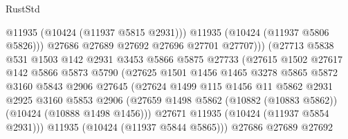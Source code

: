 \begin{lexlean}{RustStd}
\begin{coremodule}
                                      @11935
                                      (@10424 (@11937 @5815 @2931)))
                                    @11935
                                    (@10424 (@11937 @5806 @5826)))
                                  @27686
                                  @27689
                                  @27692
                                  @27696
                                  @27701
                                  @27707)))
                            (@27713
                              @5838
                              @531
                              @1503
                              @142
                              @2931
                              @3453
                              @5866
                              @5875
                              @27733
                              (@27615
                                @1502
                                @27617
                                @142
                                @5866
                                @5873
                                @5790
                                (@27625
                                  @1501
                                  @1456
                                  @1465
                                  @3278
                                  @5865
                                  @5872
                                  @3160
                                  @5843
                                  @2906
                                  @27645
                                  (@27624
                                    @1499
                                    @115
                                    @1456
                                    @11
                                    @5862
                                    @2931
                                    @2925
                                    @3160
                                    @5853
                                    @2906
                                    (@27659
                                      @1498
                                      @5862
                                      (@10882 (@10883 @5862))
                                      (@10424 (@10888 @1498 @1456)))
                                    @27671
                                    @11935
                                    (@10424 (@11937 @5854 @2931)))
                                  @11935
                                  (@10424 (@11937 @5844 @5865)))
                                @27686
                                @27689
                                @27692

\end{coremodule}
\end{lexlean}
